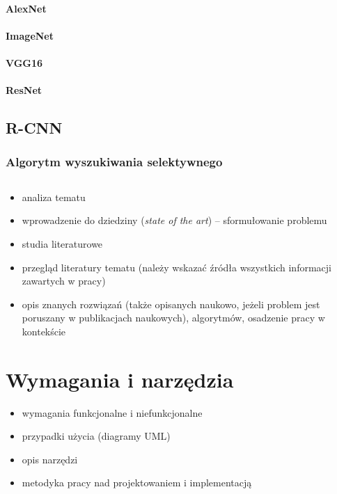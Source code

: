 \documentclass[a4paper,twoside,12pt]{book}
\newcommand{\obcy}[1]{\emph{#1}}
\newcommand{\ang}[1]{{\selectlanguage{british}\obcy{#1}}}
\begin{document}
\subsubsection{AlexNet}
\subsubsection{ImageNet}
\subsubsection{VGG16}
\subsubsection{ResNet}
\section{R-CNN}
\subsection{Algorytm wyszukiwania selektywnego}
\section{}
\begin{itemize}
\item analiza tematu
\item  wprowadzenie do dziedziny (\ang{state of the art}) – sformułowanie problemu
\item  studia literaturowe %
\item  przegląd literatury tematu (należy wskazać źródła wszystkich informacji zawartych w pracy)
\item  opis znanych rozwiązań (także opisanych naukowo, jeżeli problem jest poruszany w publikacjach naukowych), algorytmów, osadzenie pracy w kontekście
\end{itemize}

 
\chapter{Wymagania i narzędzia}

\begin{itemize}
\item wymagania funkcjonalne i niefunkcjonalne
\item przypadki użycia (diagramy UML)
\item opis narzędzi
\item metodyka pracy nad projektowaniem i implementacją
\end{itemize}
\end{document}
